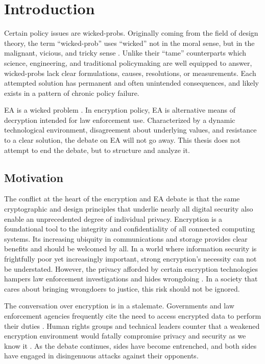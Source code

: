 \chapter{Introduction}
\label{chap-introduction}

Certain policy issues are \acp{wicked-prob}. Originally coming from the field of design theory, the term
``\ac{wicked-prob}'' uses ``wicked'' not in the moral sense, but in the malignant, vicious, and tricky sense
\cite{rittel_dilemmas_1973}. Unlike their ``tame'' counterparts which science, engineering, and traditional policymaking
are well equipped to answer, \acp{wicked-prob} lack clear formulations, causes, resolutions, or measurements. Each
attempted solution has permanent and often unintended consequences, and likely exists in a pattern of chronic policy
failure.

\Acl{EA} is a wicked problem \cite{rozenshtein_wicked_2018}. In encryption policy, \ac{EA} is alternative means of
decryption intended for law enforcement use. Characterized by a dynamic technological environment, disagreement about
underlying values, and resistance to a clear solution, the debate on \ac{EA} will not go away. This thesis does not
attempt to end the debate, but to structure and analyze it.



\section{Motivation}
\label{sec-motivation}

The conflict at the heart of the encryption and \ac{EA} debate is that the same cryptographic and design principles that
underlie nearly all digital security also enable an unprecedented degree of individual privacy. Encryption is a
foundational tool to the integrity and confidentiality of all connected computing systems. Its increasing ubiquity in
communications and storage provides clear benefits and should be welcomed by all. In a world where information security
is frightfully poor yet increasingly important, strong encryption's necessity can not be understated. However, the
privacy afforded by certain encryption technologies hampers law enforcement investigations and hides wrongdoing
\cite{cox_2020} \cite{keller_internet_2019}. In a society that cares about bringing wrongdoers to justice, this risk
should not be ignored.

The conversation over encryption is in a stalemate. Governments and law enforcement agencies frequently cite the need to
access encrypted data to perform their duties \cite{ministerial_2018} \cite{intl_2020} \cite{comey_2014}. Human rights
groups and technical leaders counter that a weakened encryption environment would fatally compromise privacy and
security as we know it \cite{abelson_2015} \cite{eightythree_2017} \cite{ruiz_there_2018}. As the debate continues,
sides have become entrenched, and both sides have engaged in disingenuous attacks against their opponents.

